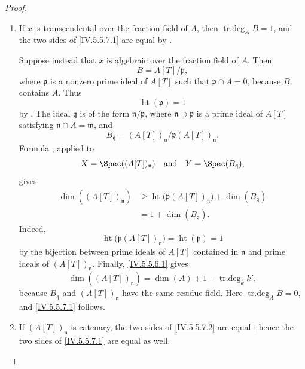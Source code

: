 \begin{proof}
\begin{enumerate}[{\rm(i)}]
\item
If $x$ is transcendental over the fraction field of $A$, then
$\operatorname{tr.deg}_A B=1$, and the two sides of
\eqref{IV.5.5.7.1} are equal by .

Suppose instead that $x$ is algebraic over the fraction field of
$A$.
Then
\[
B=A[T]/\mathfrak p,
\]
where $\mathfrak p$ is a nonzero prime ideal of $A[T]$ such that
$\mathfrak p\cap A=0$, because $B$ contains $A$.
Thus
\[
\operatorname{ht}(\mathfrak p)=1
\]
by .
The ideal $\mathfrak q$ is of the form
$\mathfrak n/\mathfrak p$, where
$\mathfrak n\supset\mathfrak p$ is a prime ideal of $A[T]$ satisfying
$\mathfrak n\cap A=\mathfrak m$, and
\[
B_{\mathfrak q}
 =(A[T])_{\mathfrak n}/\mathfrak p(A[T])_{\mathfrak n}.
\]
Formula , applied to
\[
X=\Spec((A[T])_{\mathfrak n})
\quad\text{and}\quad
Y=\Spec(B_{\mathfrak q}),
\]
gives
\begin{equation}
\begin{split}
\dim((A[T])_{\mathfrak n})
 &\geq
 \operatorname{ht}\bigl(\mathfrak p(A[T])_{\mathfrak n}\bigr)
   +\dim(B_{\mathfrak q}) \\
 &=1+\dim(B_{\mathfrak q}).
\end{split}
\tag{5.5.7.2}\label{IV.5.5.7.2}
\end{equation}
Indeed,
\[
\operatorname{ht}\bigl(\mathfrak p(A[T])_{\mathfrak n}\bigr)
 =\operatorname{ht}(\mathfrak p)=1
\]
by the bijection between prime ideals of $A[T]$ contained in
$\mathfrak n$ and prime ideals of $(A[T])_{\mathfrak n}$.
Finally, \eqref{IV.5.5.6.1} gives
\begin{equation}
\dim((A[T])_{\mathfrak n})
 =\dim(A)+1-\operatorname{tr.deg}_k k',
\tag{5.5.7.3}\label{IV.5.5.7.3}
\end{equation}
because $B_{\mathfrak q}$ and $(A[T])_{\mathfrak n}$ have the same
residue field.
Here $\operatorname{tr.deg}_A B=0$, and
\eqref{IV.5.5.7.1} follows.

\item
If $(A[T])_{\mathfrak n}$ is catenary, the two sides of
\eqref{IV.5.5.7.2} are equal ; hence the two sides
of \eqref{IV.5.5.7.1} are equal as well.
\end{enumerate}
\end{proof}

